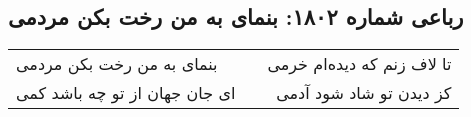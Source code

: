 \begin{center}
\section*{رباعی شماره ۱۸۰۲: بنمای به من رخت بکن مردمی}
\label{sec:1802}
\begin{longtable}{l p{0.5cm} r}
بنمای به من رخت بکن مردمی
&&
تا لاف زنم که دیده‌ام خرمی
\\
ای جان جهان از تو چه باشد کمی
&&
کز دیدن تو شاد شود آدمی
\\
\end{longtable}
\end{center}
